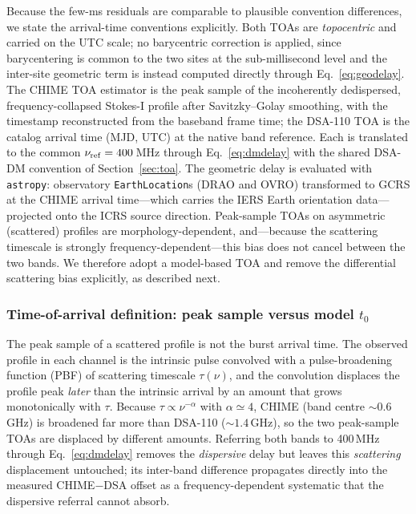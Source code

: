 Because the few-ms residuals are comparable to plausible convention
differences, we state the arrival-time conventions explicitly. Both TOAs are
\emph{topocentric} and carried on the UTC scale; no barycentric correction is
applied, since barycentering is common to the two sites at the
sub-millisecond level and the inter-site geometric term is instead computed
directly through Eq.~\eqref{eq:geodelay}. The CHIME TOA estimator is the peak
sample of the incoherently dedispersed, frequency-collapsed Stokes-I profile
after Savitzky--Golay smoothing, with the timestamp reconstructed from the
baseband frame time; the DSA-110 TOA is the catalog arrival time (MJD, UTC)
at the native band reference. Each is translated to the common
$\nu_{\rm ref}=400$\,MHz through Eq.~\eqref{eq:dmdelay} with the shared
DSA-DM convention of Section~\ref{sec:toa}. The geometric delay is evaluated
with \texttt{astropy}: observatory \texttt{EarthLocation}s (DRAO and OVRO)
transformed to GCRS at the CHIME arrival time---which carries the IERS Earth
orientation data---projected onto the ICRS source direction.
Peak-sample TOAs on asymmetric (scattered) profiles are
morphology-dependent, and---because the scattering timescale is strongly
frequency-dependent---this bias does not cancel between the two bands. We
therefore adopt a model-based TOA and remove the differential scattering bias
explicitly, as described next.

\subsubsection{Time-of-arrival definition: peak sample versus model \texorpdfstring{$t_0$}{t0}}
\label{sec:toa-definition}

The peak sample of a scattered profile is not the burst arrival time. The
observed profile in each channel is the intrinsic pulse convolved with a
pulse-broadening function (PBF) of scattering timescale $\tau(\nu)$, and the
convolution displaces the profile peak \emph{later} than the intrinsic
arrival by an amount that grows monotonically with $\tau$. Because
$\tau\propto\nu^{-\alpha}$ with $\alpha\simeq4$, CHIME (band centre
$\sim0.6$\,GHz) is broadened far more than DSA-110 ($\sim1.4$\,GHz), so the two
peak-sample TOAs are displaced by different amounts. Referring both bands to
400\,MHz through Eq.~\eqref{eq:dmdelay} removes the \emph{dispersive} delay but
leaves this \emph{scattering} displacement untouched; its inter-band difference
propagates directly into the measured CHIME$-$DSA offset as a frequency-dependent
systematic that the dispersive referral cannot absorb.

